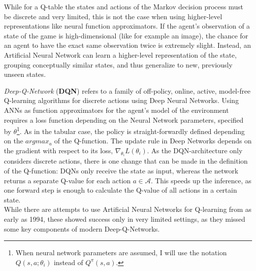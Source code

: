 While for a Q-table the states and actions of the Markov decision process must be discrete and very limited, this is not the case when using higher-level representations like neural function approximators. If the agent's observation of a state of the game is high-dimensional (like for example an image), the chance for an agent to have the exact same observation twice is extremely slight. Instead, an Artificial Neural Network can learn a higher-level representation of the state, grouping conceptually similar states, and thus generalize to new, previously unseen states. 

\textit{Deep-Q-Network} (\textbf{DQN}) refers to a family of off-policy, online, active, model-free Q-learning algorithms for discrete actions using Deep Neural Networks. %
Using ANNs as function approximators for the agent's model of the environment requires a loss function depending on the Neural Network parameters, specified by $\theta$\footnote{When neural network parameters are assumed, I will use the notation $Q(s,a;\theta_i)$ instead of $Q^\pi(s,a)$.}. As in the tabular case, the policy is straight-forwardly defined depending on the $argmax_a$ of the Q-function. The update rule in Deep Networks depends on the gradient with respect to its loss, $\nabla_{\theta_i}L(\theta_i)$.  %
As the DQN-architecture only considers discrete actions, there is one change that can be made in the definition of the Q-function: DQNs only receive the state as input, whereas the network returns a separate Q-value for each action $a \in \mathcal{A}$. This speeds up the inference, as one forward step is enough to calculate the Q-value of all actions in a certain state.\\

While there are attempts to use Artificial Neural Networks for Q-learning from as early as 1994\cite{rummery_-line_1994}, these showed success only in very limited settings, as they missed some key components of modern Deep-Q-Networks. 

